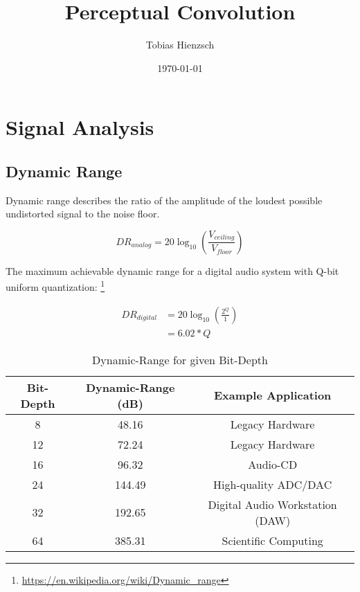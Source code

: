 \documentclass{report}
\title{Perceptual Convolution}
\author{Tobias Hienzsch}
\date{\today}
\begin{document}
\maketitle
\newpage

\tableofcontents
\newpage

\thispagestyle{empty}
\listoffigures
\listoftables
\listofalgorithms
\newpage


\chapter{Signal Analysis}

\section{Dynamic Range}

Dynamic range describes the ratio of the amplitude of the loudest possible
undistorted signal to the noise floor. \cite{Mller2021}

\begin{equation}
    DR_{analog} = 20\log_{10} \left(\frac{V_{ceiling}}{V_{floor}}\right)
\end{equation}

The maximum achievable dynamic range for a digital audio system with Q-bit
uniform quantization:
\footnote{\url{https://en.wikipedia.org/wiki/Dynamic_range}}

\begin{equation}
    \begin{split}
        DR_{digital} & = 20\log_{10} \left(\frac{2^Q}{1}\right) \\
                     & = 6.02 * Q
    \end{split}
\end{equation}

\begin{center}

\end{center}

\begin{table}[h!]
    \centering
    \begin{tabular}{||c c c||}
        \hline
        Bit-Depth & Dynamic-Range (dB) & Example Application \\
        \hline
        \hline
        8 & 48.16 & Legacy Hardware \\
        \hline
        12 & 72.24 & Legacy Hardware \\
        \hline
        16 & 96.32 & Audio-CD \\
        \hline
        24 & 144.49 & High-quality ADC/DAC \\
        \hline
        32 & 192.65 & Digital Audio Workstation (DAW) \\
        \hline
        64 & 385.31 & Scientific Computing \\
        \hline
    \end{tabular}
    \caption{Dynamic-Range for given Bit-Depth}
    \label{table:1}
\end{table}
\end{document}
